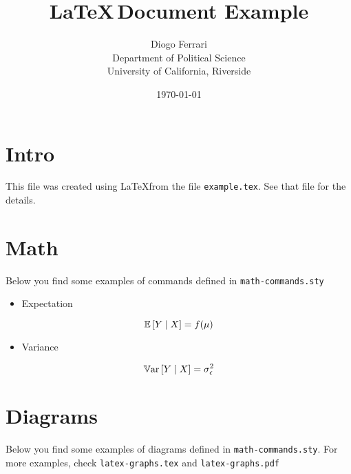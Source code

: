 \documentclass[a4paper]{article}
\author{Diogo Ferrari\\
Department of Political Science\\
University of California, Riverside\\
}
\date{\today}
\title{\LaTeX \(\,\)Document Example}
\begin{document}
\maketitle

\section{Intro}
\label{sec:org321b77f}

This file was created using \LaTeX from the file \texttt{example.tex}. See that file for the details.
\section{Math}
\label{sec:orgd7ae05b}


Below you find some examples of commands defined in \texttt{math-commands.sty}
\begin{itemize}
\item Expectation
\end{itemize}
\[
\mathbb{E}\left[ Y \mid X \right] = f(\mu )
\]
\begin{itemize}
\item Variance
\end{itemize}
\[
\mathbb{V}\text{ar}\left[Y \mid X \right] = \sigma_{\epsilon }^{2} 
\]
\section{Diagrams}
\label{sec:org498a58e}

Below you find some examples of diagrams defined in \texttt{math-commands.sty}. For more examples, check \texttt{latex-graphs.tex} and \texttt{latex-graphs.pdf}

\begin{figure}[ht]\centering
{}
\end{figure}

\pagebreak



\end{document}
